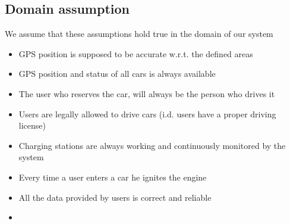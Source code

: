 	

\subsection{Domain assumption}
	We assume that these assumptions hold true in the domain of our system 
	\begin{itemize}
		\item GPS position is supposed to be accurate w.r.t. the defined areas
		\item GPS position and status of all cars is always available
		\item The user who reserves the car, will always be the person who drives it
		\item Users are legally allowed to drive cars (i.d. users have a proper driving license)
		\item Charging stations are always working and continuously monitored by the system
		\item Every time a user enters a car he ignites the engine
		\item All the data provided by users is correct and reliable
		\item 
	\end{itemize}